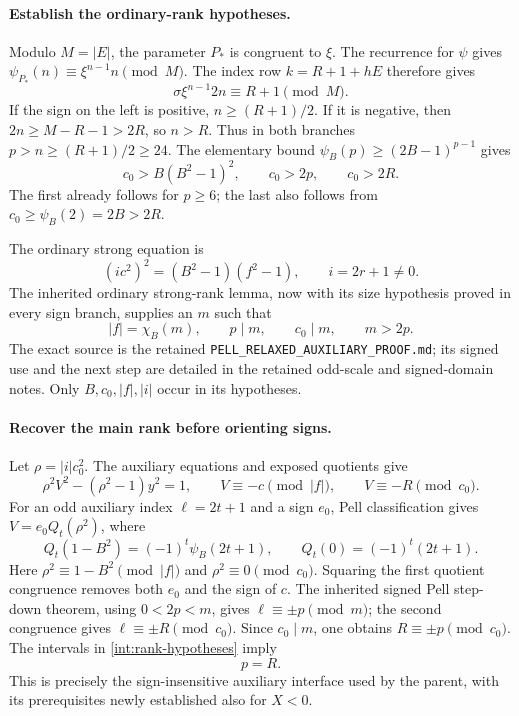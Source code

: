 \paragraph{Establish the ordinary-rank hypotheses.}
Modulo $M=|E|$, the parameter $P_*$ is congruent to $\xi$.
The recurrence for $\psi$ gives
$\psi_{P_*}(n)\equiv\xi^{n-1}n\pmod M$.
The index row $k=R+1+hE$ therefore gives
\begin{equation}\label{int:first-index}
 \sigma\xi^{n-1}2n\equiv R+1\pmod M.
\end{equation}
If the sign on the left is positive, $n\geq(R+1)/2$.
If it is negative, then $2n\geq M-R-1>2R$, so $n>R$.
Thus in both branches $p>n\geq(R+1)/2\geq24$.
The elementary bound $\psi_B(p)\geq(2B-1)^{p-1}$ gives
\begin{equation}\label{int:rank-hypotheses}
 c_0>B(B^2-1)^2,\qquad c_0>2p,\qquad c_0>2R.
\end{equation}
The first already follows for $p\geq6$; the last also follows from
$c_0\geq\psi_B(2)=2B>2R$.

The ordinary strong equation is
\[
 (ic^2)^2=(B^2-1)(f^2-1),\qquad i=2r+1\neq0.
\]
The inherited ordinary strong-rank lemma, now with its size hypothesis
proved in every sign branch, supplies an $m$ such that
\begin{equation}\label{int:strong-rank}
 |f|=\chi_B(m),\qquad p\mid m,\qquad c_0\mid m,\qquad m>2p.
\end{equation}
The exact source is the retained
\texttt{PELL\_RELAXED\_AUXILIARY\_PROOF.md}; its signed use and the
next step are detailed in the retained odd-scale and signed-domain notes.
Only $B,c_0,|f|,|i|$ occur in its hypotheses.

\paragraph{Recover the main rank before orienting signs.}
Let $\rho=|i|c_0^2$.  The auxiliary equations and exposed quotients give
\[
 \rho^2V^2-(\rho^2-1)y^2=1,\qquad
 V\equiv-c\pmod{|f|},\qquad V\equiv-R\pmod{c_0}.
\]
For an odd auxiliary index $\ell=2t+1$ and a sign $e_0$, Pell
classification gives $V=e_0 Q_t(\rho^2)$, where
\[
 Q_t(1-B^2)=(-1)^t\psi_B(2t+1),\qquad
 Q_t(0)=(-1)^t(2t+1).
\]
Here $\rho^2\equiv1-B^2\pmod{|f|}$ and
$\rho^2\equiv0\pmod{c_0}$.  Squaring the first quotient congruence
removes both $e_0$ and the sign of $c$.  The inherited signed Pell
step-down theorem, using $0<2p<m$, gives
$\ell\equiv\pm p\pmod m$; the second congruence gives
$\ell\equiv\pm R\pmod{c_0}$.
Since $c_0\mid m$, one obtains $R\equiv\pm p\pmod{c_0}$.
The intervals in \eqref{int:rank-hypotheses} imply
\begin{equation}\label{int:p-equals-R}
                         p=R.
\end{equation}
This is precisely the sign-insensitive auxiliary interface used by the
parent, with its prerequisites newly established also for $X<0$.

